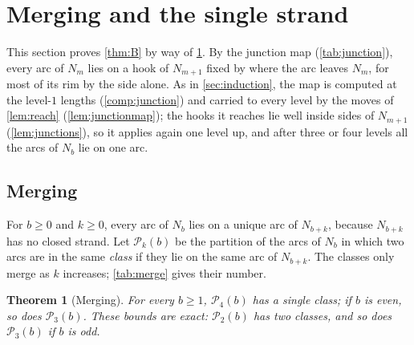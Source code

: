 \documentclass[11pt]{amsart}
\newtheorem{theorem}{Theorem}[section]
\theoremstyle{definition}
\theoremstyle{remark}
\begin{document}
\section{Merging and the single strand}\label{sec:strand}
\suppressfloats[t]

This section proves \cref{thm:B} by way of \cref{thm:merge}. By the junction map (\cref{tab:junction}), every arc of
$N_m$ lies on a hook of $N_{m+1}$ fixed by where the arc leaves $N_m$, for most of its rim by the side alone. As in
\cref{sec:induction}, the map is computed at the level-$1$ lengths (\cref{comp:junction}) and carried to every level by
the moves of \cref{lem:reach} (\cref{lem:junctionmap}); the hooks it reaches lie well inside sides of $N_{m+1}$
(\cref{lem:junctions}), so it applies again one level up, and after three or four levels all the arcs of $N_b$ lie on
one arc.

\subsection{Merging}\label{sec:merging}
For $b\ge0$ and $k\ge0$, every arc of $N_b$ lies on a unique arc of $N_{b+k}$, because $N_{b+k}$ has no closed strand.
Let $\mathcal P_k(b)$ be the partition of the arcs of $N_b$ in which two arcs are in the same \emph{class} if they lie
on the same arc of $N_{b+k}$. The classes only merge as $k$ increases; \cref{tab:merge} gives their number.

\begin{theorem}[Merging]\label{thm:merge}
For every $b\ge1$, $\mathcal P_4(b)$ has a single class; if $b$ is even, so does $\mathcal P_3(b)$. These bounds are
exact: $\mathcal P_2(b)$ has two classes, and so does $\mathcal P_3(b)$ if $b$ is odd.
\end{theorem}
\end{document}
